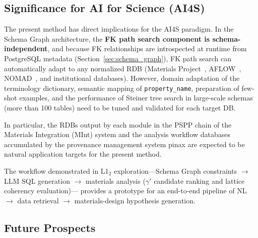\documentclass[5p,twocolumn]{elsarticle}
\begin{document}
\subsection{Significance for AI for Science (AI4S)}
\label{sec:ai4s}

The present method has direct implications for the AI4S paradigm.
In the Schema Graph architecture, the \textbf{FK path search component is schema-independent},
and because FK relationships are introspected at runtime from PostgreSQL metadata
(Section~\ref{sec:schema_graph}),
FK path search can automatically adapt to any normalized RDB (Materials Project~\citep{jain2013mp}, AFLOW~\citep{curtarolo2012aflow}, NOMAD~\citep{draxl2019nomad}, and institutional databases).
However, domain adaptation of the terminology dictionary,
semantic mapping of \texttt{property\_name}, preparation of few-shot examples,
and the performance of Steiner tree search in large-scale schemas (more than 100 tables)
need to be tuned and validated for each target DB.

In particular, the RDBs output by each module in the PSPP chain
of the Materials Integration (MInt) system\cite{minamoto2020mint}
and the analysis workflow databases accumulated by the provenance management system pinax \cite{minamoto2026pinax}
are expected to be natural application targets for the present method.

The workflow demonstrated in L1$_2$ exploration---Schema Graph constraints $\to$ LLM SQL generation $\to$
materials analysis ($\gamma'$ candidate ranking and lattice coherency evaluation)---
provides a prototype for an end-to-end pipeline of
NL $\to$ data retrieval $\to$ materials-design hypothesis generation.

\subsection{Future Prospects}
\end{document}
